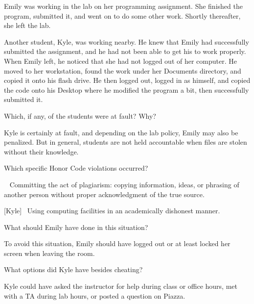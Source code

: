 
Emily was working in the lab on her programming assignment.
She finished the program, submitted it, and went on to do some other work.
Shortly thereafter, she left the lab.

\vspace{1em}

Another student, Kyle, was working nearby.
He knew that Emily had successfully submitted the assignment, and he had not been able to get his to work properly.
When Emily left, he noticed that she had not logged out of her computer.
He moved to her workstation, found the work under her Documents directory, and copied it onto his flash drive.
He then logged out, logged in as himself, and copied the code onto his Desktop where he modified the program a bit, then successfully submitted it.




\Q Which, if any, of the students were at fault? Why?

\begin{answer}[6em]
Kyle is certainly at fault, and depending on the lab policy, Emily may also be penalized.
But in general, students are not held accountable when files are stolen without their knowledge.
\end{answer}


\Q Which specific Honor Code violations occurred?

\begin{answer}[7em]
[Kyle]~ Committing the act of plagiarism: copying information, ideas, or phrasing of another person without proper acknowledgment of the true source.

\bigskip

[Kyle]~ Using computing facilities in an academically dishonest manner.
\end{answer}


\Q What should Emily have done in this situation?

\begin{answer}[6em]
To avoid this situation, Emily should have logged out or at least locked her screen when leaving the room.
\end{answer}


\Q What options did Kyle have besides cheating?

\begin{answer}[6em]
Kyle could have asked the instructor for help during class or office hours, met with a TA during lab hours, or posted a question on Piazza.
\end{answer}
